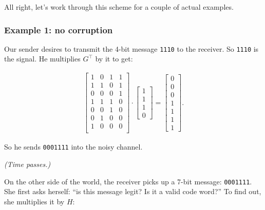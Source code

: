 \begin{alttitles}
All right, let's work through this scheme for a couple of actual examples.

\subsubsection{Example 1: no corruption}

Our sender desires to transmit the 4-bit message \texttt{1110} to the receiver.
So \texttt{1110} is the signal. He multiplies $G^\intercal$ by it to get:

\vspace{-.15in}
\begin{align*}
\begin{bmatrix}
1 & 0 & 1 & 1\\
1 & 1 & 0 & 1\\
0 & 0 & 0 & 1\\
1 & 1 & 1 & 0\\
0 & 0 & 1 & 0\\
0 & 1 & 0 & 0\\
1 & 0 & 0 & 0\\
\end{bmatrix} \cdot
\begin{bmatrix}
1 \\ 1 \\ 1 \\ 0
\end{bmatrix} = 
\begin{bmatrix}
0 \\ 0 \\ 0 \\ 1 \\ 1 \\ 1 \\ 1
\end{bmatrix}.
\end{align*}
\vspace{-.15in}

So he sends \texttt{0001111} into the noisy channel.

\textit{(Time passes.)}


On the other side of the world, the receiver picks up a 7-bit message:
\texttt{0001111}. She first asks herself: ``is this message legit? Is it a
valid code word?'' To find out, she multiplies it by $H$:


\end{alttitles}
